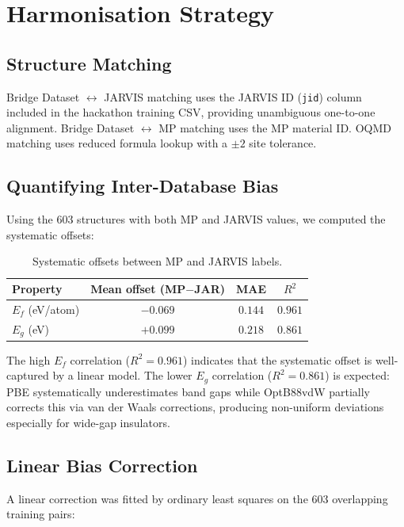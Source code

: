 \documentclass[10pt, a4paper]{article}
\begin{document}
\section{Harmonisation Strategy}
\label{sec:harmonisation}

\subsection{Structure Matching}

Bridge Dataset $\leftrightarrow$ JARVIS matching uses the JARVIS ID
(\texttt{jid}) column included in the hackathon training CSV,
providing unambiguous one-to-one alignment.
Bridge Dataset $\leftrightarrow$ MP matching uses the MP material ID.
OQMD matching uses reduced formula lookup with a $\pm 2$ site
tolerance.

\subsection{Quantifying Inter-Database Bias}

Using the 603 structures with both MP and JARVIS values, we
computed the systematic offsets:

\begin{table}[h!]
\centering
\caption{Systematic offsets between MP and JARVIS labels.}
\label{tab:offsets}
\begin{tabular}{@{}lccc@{}}
\toprule
Property & Mean offset (MP$-$JAR) & MAE & $R^2$ \\
\midrule
$E_f$ (eV/atom) & $-0.069$ & $0.144$ & $0.961$ \\
$E_g$ (eV)      & $+0.099$ & $0.218$ & $0.861$ \\
\bottomrule
\end{tabular}
\end{table}

The high $E_f$ correlation ($R^2 = 0.961$) indicates that the
systematic offset is well-captured by a linear model.
The lower $E_g$ correlation ($R^2 = 0.861$) is expected: PBE
systematically underestimates band gaps while OptB88vdW partially
corrects this via van der Waals corrections, producing non-uniform
deviations especially for wide-gap insulators.

\subsection{Linear Bias Correction}

A linear correction was fitted by ordinary least squares on the
603 overlapping training pairs:
\end{document}
